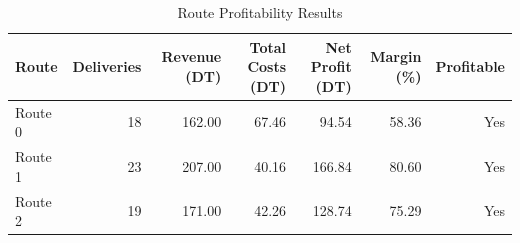 \begin{table}[ht]
\centering
\caption{Route Profitability Results}
\label{tab:route-profitability}
\begin{tabular}{lrrrrrr}
\hline
Route & Deliveries & Revenue (DT) & Total Costs (DT) & Net Profit (DT) & Margin (\%) & Profitable \\
\hline
Route 0 & 18 & 162.00 & 67.46 & 94.54 & 58.36 & Yes \\
Route 1 & 23 & 207.00 & 40.16 & 166.84 & 80.60 & Yes \\
Route 2 & 19 & 171.00 & 42.26 & 128.74 & 75.29 & Yes \\
\hline
\end{tabular}
\end{table}